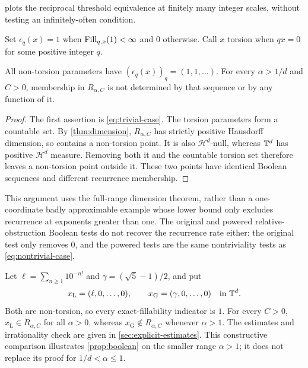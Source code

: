 \documentclass[11pt,a4paper]{article}
\begin{document}
 plots the reciprocal threshold equivalence
at finitely many integer scales, without testing an infinitely-often
condition.


Set $\epsilon_q(x)=1$ when $\operatorname{Fill}_{q,x}(1)<\infty$ and $0$ otherwise.
Call $x$ torsion when $qx=0$ for some positive integer $q$.

\begin{proposition}
\label{prop:boolean}
All non-torsion parameters have $(\epsilon_q(x))_q=(1,1,\ldots)$.
For every $\alpha>1/d$ and $C>0$, membership in $R_{\alpha,C}$ is not
determined by that sequence or by any function of it.
\end{proposition}

\begin{proof}
The first assertion is \cref{eq:trivial-case}.  The torsion parameters
form a countable set.  By \cref{thm:dimension}, $R_{\alpha,C}$ has
strictly positive Hausdorff dimension, so contains a non-torsion point.
It is also $\mathcal H^d$-null, whereas $\mathbb T^d$ has positive
$\mathcal H^d$ measure.  Removing both it and the countable torsion set
therefore leaves a non-torsion point outside it.  These two points have
identical Boolean sequences and different recurrence membership.
\end{proof}

This argument uses the full-range dimension theorem, rather than a
one-coordinate badly approximable example whose lower bound only excludes
recurrence at exponents greater than one.  The original and powered
relative-obstruction Boolean tests do not recover the recurrence rate
either: the original test only removes $0$, and the powered tests are
the same nontriviality tests as \cref{eq:nontrivial-case}.

\begin{example}
\label{ex:explicit-arithmetic}
Let $\ell=\sum_{n\geq1}10^{-n!}$ and $\gamma=(\sqrt5-1)/2$, and put
\[
 x_{\mathrm L}=(\ell,0,\ldots,0),\qquad
 x_{\mathrm G}=(\gamma,0,\ldots,0)\quad\text{in }\mathbb T^d.
\]
Both are non-torsion, so every exact-fillability indicator is $1$.
For every $C>0$, $x_{\mathrm L}\in R_{\alpha,C}$ for all $\alpha>0$,
whereas $x_{\mathrm G}\notin R_{\alpha,C}$ whenever $\alpha>1$.
The estimates and irrationality check are given in \cref{sec:explicit-estimates}.
This constructive comparison illustrates \cref{prop:boolean} on the
smaller range $\alpha>1$; it does not replace its proof for
$1/d<\alpha\leq1$.
\end{example}
\end{document}
